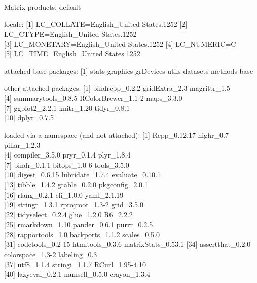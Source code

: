 \documentclass[]{article}
\begin{document}
Matrix products: default

locale: {[}1{]} LC\_COLLATE=English\_United States.1252 {[}2{]}
LC\_CTYPE=English\_United States.1252\\
{[}3{]} LC\_MONETARY=English\_United States.1252 {[}4{]} LC\_NUMERIC=C\\
{[}5{]} LC\_TIME=English\_United States.1252

attached base packages: {[}1{]} stats graphics grDevices utils datasets
methods base

other attached packages: {[}1{]} bindrcpp\_0.2.2 gridExtra\_2.3
magrittr\_1.5\\
{[}4{]} summarytools\_0.8.5 RColorBrewer\_1.1-2 maps\_3.3.0\\
{[}7{]} ggplot2\_2.2.1 knitr\_1.20 tidyr\_0.8.1\\
{[}10{]} dplyr\_0.7.5

loaded via a namespace (and not attached): {[}1{]} Rcpp\_0.12.17
highr\_0.7 pillar\_1.2.3\\
{[}4{]} compiler\_3.5.0 pryr\_0.1.4 plyr\_1.8.4\\
{[}7{]} bindr\_0.1.1 bitops\_1.0-6 tools\_3.5.0\\
{[}10{]} digest\_0.6.15 lubridate\_1.7.4 evaluate\_0.10.1\\
{[}13{]} tibble\_1.4.2 gtable\_0.2.0 pkgconfig\_2.0.1\\
{[}16{]} rlang\_0.2.1 cli\_1.0.0 yaml\_2.1.19\\
{[}19{]} stringr\_1.3.1 rprojroot\_1.3-2 grid\_3.5.0\\
{[}22{]} tidyselect\_0.2.4 glue\_1.2.0 R6\_2.2.2\\
{[}25{]} rmarkdown\_1.10 pander\_0.6.1 purrr\_0.2.5\\
{[}28{]} rapportools\_1.0 backports\_1.1.2 scales\_0.5.0\\
{[}31{]} codetools\_0.2-15 htmltools\_0.3.6 matrixStats\_0.53.1 {[}34{]}
assertthat\_0.2.0 colorspace\_1.3-2 labeling\_0.3\\
{[}37{]} utf8\_1.1.4 stringi\_1.1.7 RCurl\_1.95-4.10\\
{[}40{]} lazyeval\_0.2.1 munsell\_0.5.0 crayon\_1.3.4
\end{document}
